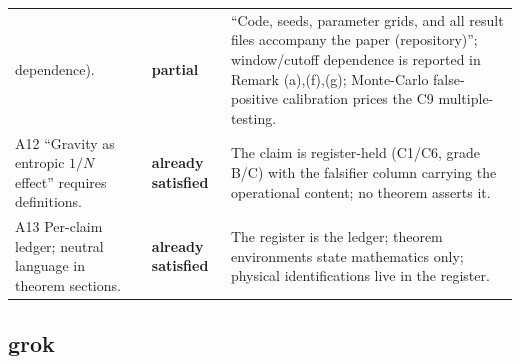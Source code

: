 \documentclass[11pt,a4paper]{article}
\newcommand{\pver}{\textbf{partial}}
\newcommand{\sat}{\textbf{already satisfied}}
\begin{document}
\begin{longtable}{@{}p{}p{}p{}@{}}
dependence). & \pver & ``Code, seeds, parameter grids, and all result files
accompany the paper (repository)''; window/cutoff dependence is reported in
Remark (a),(f),(g); Monte-Carlo false-positive calibration prices the C9
multiple-testing.\\
A12 ``Gravity as entropic $1/N$ effect'' requires definitions. & \sat & The
claim is register-held (C1/C6, grade B/C) with the falsifier column carrying
the operational content; no theorem asserts it.\\
A13 Per-claim ledger; neutral language in theorem sections. & \sat & The
register is the ledger; theorem environments state mathematics only; physical
identifications live in the register.\\
\bottomrule
\end{longtable}

\subsection{grok}
\end{document}
